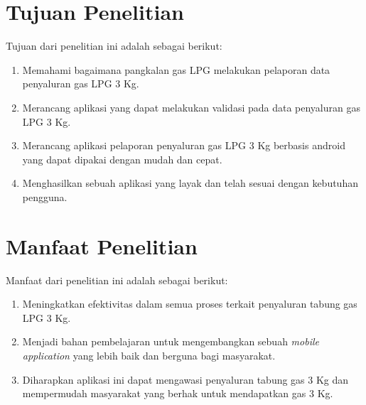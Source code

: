 \section{Tujuan Penelitian}
Tujuan dari penelitian ini adalah sebagai berikut:
\begin{enumerate}
	\item Memahami bagaimana pangkalan gas LPG melakukan pelaporan data penyaluran gas LPG 3 Kg.
	\item Merancang aplikasi yang dapat melakukan validasi pada data penyaluran gas LPG 3 Kg.
	\item Merancang aplikasi pelaporan penyaluran gas LPG 3 Kg berbasis android yang dapat dipakai dengan mudah dan cepat.
	\item Menghasilkan sebuah aplikasi yang layak dan telah sesuai dengan kebutuhan pengguna.
\end{enumerate}


\section{Manfaat Penelitian}
Manfaat dari penelitian ini adalah sebagai berikut:
\begin{enumerate}
	\item Meningkatkan efektivitas dalam semua proses terkait penyaluran tabung gas LPG 3 Kg.
	\item Menjadi bahan pembelajaran untuk mengembangkan sebuah \textit{mobile application} yang lebih baik dan berguna bagi masyarakat.
	\item Diharapkan aplikasi ini dapat mengawasi penyaluran tabung gas 3 Kg dan mempermudah masyarakat yang berhak untuk mendapatkan gas 3 Kg.
\end{enumerate}

